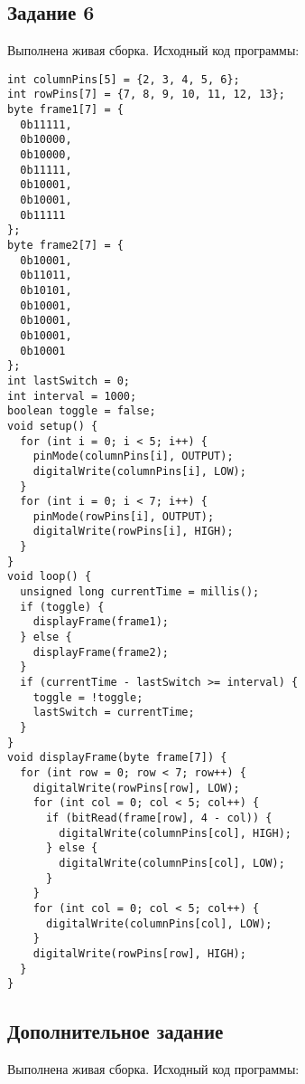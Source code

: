 \documentclass[a4paper,14pt]{extarticle}
\begin{document}
  \subsection*{\hspace{12.5mm}Задание 6}
  Выполнена живая сборка. Исходный код программы:

  \begingroup
    \fontsize{14pt}{10pt}\selectfont
    \linespread{1}
    \begin{verbatim}
int columnPins[5] = {2, 3, 4, 5, 6};
int rowPins[7] = {7, 8, 9, 10, 11, 12, 13};
byte frame1[7] = {
  0b11111,
  0b10000,
  0b10000,
  0b11111,
  0b10001,
  0b10001,
  0b11111
};
byte frame2[7] = {
  0b10001,
  0b11011,
  0b10101,
  0b10001,
  0b10001,
  0b10001,
  0b10001
};
int lastSwitch = 0;
int interval = 1000;
boolean toggle = false;
void setup() {
  for (int i = 0; i < 5; i++) {
    pinMode(columnPins[i], OUTPUT);
    digitalWrite(columnPins[i], LOW);
  }
  for (int i = 0; i < 7; i++) {
    pinMode(rowPins[i], OUTPUT);
    digitalWrite(rowPins[i], HIGH);
  }
}
void loop() {
  unsigned long currentTime = millis();
  if (toggle) {
    displayFrame(frame1);
  } else {
    displayFrame(frame2);
  }
  if (currentTime - lastSwitch >= interval) {
    toggle = !toggle;
    lastSwitch = currentTime;
  }
}
void displayFrame(byte frame[7]) {
  for (int row = 0; row < 7; row++) {
    digitalWrite(rowPins[row], LOW);
    for (int col = 0; col < 5; col++) {
      if (bitRead(frame[row], 4 - col)) {
        digitalWrite(columnPins[col], HIGH);
      } else {
        digitalWrite(columnPins[col], LOW);
      }
    }
    for (int col = 0; col < 5; col++) {
      digitalWrite(columnPins[col], LOW);
    }
    digitalWrite(rowPins[row], HIGH);
  }
}
    \end{verbatim}
  \endgroup

  \subsection*{\hspace{12.5mm}Дополнительное задание}
  Выполнена живая сборка. Исходный код программы:
\end{document}
